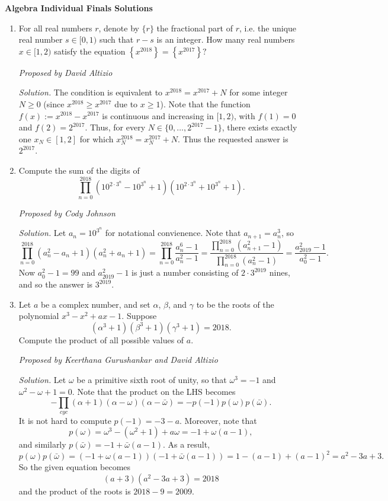 \documentclass[10pt]{article}
\newcommand{\proposed}[1]
{
\vspace{3pt}
\noindent\textit{Proposed by #1}
}
\newcommand{\solution}
{
\vspace{3pt}
\noindent\textit{Solution.}\qquad
}
\begin{document}
\begin{center}
\huge\textbf{Algebra Individual Finals Solutions}
\end{center} \vspace{3pt}

\begin{enumerate}

\item For all real numbers $r$, denote by $\{r\}$ the fractional part of $r$, i.e. the unique real number $s\in[0,1)$ such that $r-s$ is an integer.  How many real numbers $x\in[1,2)$ satisfy the equation $\left\{x^{2018}\right\} = \left\{x^{2017}\right\}?$

\proposed{David Altizio}

\solution The condition is equivalent to $x^{2018} = x^{2017} + N$ for some integer $N\geq 0$ (since $x^{2018}\geq x^{2017}$ due to $x\geq 1$).  Note that the function $f(x) := x^{2018} - x^{2017}$ is continuous and increasing in $[1,2)$, with $f(1) = 0$ and $f(2) = 2^{2017}$.  Thus, for every $N\in\{0,\ldots, 2^{2017}-1\}$, there exists exactly one $x_N\in[1,2]$ for which $x_N^{2018} = x_N^{2017} + N$.  Thus the requested answer is $\boxed{2^{2017}}$.

\item Compute the sum of the digits of \[\prod_{n=0}^{2018}\left(10^{2\cdot 3^n} - 10^{3^n} + 1\right)\left(10^{2\cdot 3^n} + 10^{3^n} + 1\right).\]

\proposed{Cody Johnson}

\solution Let $a_n = 10^{3^n}$ for notational convienence.  Note that $a_{n+1} = a_n^3$, so \[\prod_{n=0}^{2018}(a_n^2 - a_n + 1)(a_n^2 + a_n + 1) = \prod_{n=0}^{2018}\frac{a_n^6 - 1}{a_n^2 - 1} = \frac{\prod_{n=0}^{2018}(a_{n+1}^2 - 1)}{\prod_{n=0}^{2018}(a_n^2 - 1)} = \frac{a_{2019}^2 - 1}{a_0^2 - 1}.\] Now $a_0^2 - 1 = 99$ and $a_{2019}^2 - 1$ is just a number consisting of $2\cdot 3^{2019}$ nines, and so the answer is $\boxed{3^{2019}}$.

\item Let $a$ be a complex number, and set $\alpha$, $\beta$, and $\gamma$ to be the roots of the polynomial $x^3 - x^2 + ax - 1$.  Suppose \[(\alpha^3+1)(\beta^3+1)(\gamma^3+1) = 2018.\] Compute the product of all possible values of $a$.

\proposed{Keerthana Gurushankar and David Altizio}

\solution Let $\omega$ be a primitive sixth root of unity, so that $\omega^3 = -1$ and $\omega^2 - \omega + 1 = 0$.  Note that the product on the LHS becomes \[-\prod_{cyc}(\alpha+1)(\alpha-\omega)(\alpha-\bar\omega) = -p(-1)p(\omega)p(\bar\omega).\] It is not hard to compute $p(-1) = -3-a$.  Moreover, note that \[p(\omega) = \omega^3 - (\omega^2 + 1) + a\omega = -1 + \omega(a-1),\] and similarly $p(\bar\omega) = -1 + \bar\omega(a-1)$.  As a result, \[p(\omega)p(\bar\omega) = (-1 + \omega(a-1))(-1 + \bar\omega(a-1)) = 1 - (a-1) + (a-1)^2 = a^2 - 3a + 3.\] So the given equation becomes \[(a+3)(a^2 - 3a + 3) = 2018\] and the product of the roots is $2018 - 9 = \boxed{2009}$.

\end{enumerate}
\end{document}
